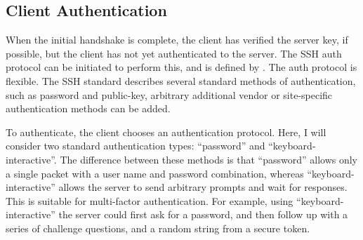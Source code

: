 \subsection{Client Authentication}

When the initial handshake is complete, the client has verified the
server key, if possible, but the client has not yet authenticated
to the server. The SSH auth protocol can be initiated to perform this,
and is defined by \cite{rfc4252}. The auth protocol is flexible.
The SSH standard describes several standard methods of authentication,
such as password and public-key, arbitrary additional vendor or site-specific
authentication methods can be added.

To authenticate, the client chooses an authentication protocol. Here,
I will consider two standard authentication types: {}``password''
and {}``keyboard-interactive''. The difference between these methods
is that {}``password'' allows only a single packet with a user name
and password combination, whereas {}``keyboard-interactive'' allows
the server to send arbitrary prompts and wait for responses. This
is suitable for multi-factor authentication. For example, using {}``keyboard-interactive''
the server could first ask for a password, and then follow up with
a series of challenge questions, and a random string from a secure
token.

